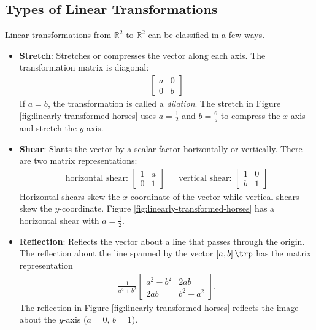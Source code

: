 \subsection*{Types of Linear Transformations} %

Linear transformations from $\mathbb{R}^2$ to $\mathbb{R}^2$ can be classified in a few ways.

\begin{itemize}

\item \textbf{Stretch}: %
Stretches or compresses the vector along each axis.
The transformation matrix is diagonal:
%
\begin{align*}
\left[\begin{array}{rr}
a & 0  \\
0 & b
\end{array}\right]
\end{align*}
%
If $a=b$, the transformation is called a \emph{dilation}.
The stretch in Figure \ref{fig:linearly-transformed-horses} uses $a = \frac{1}{2}$ and $b = \frac{6}{5}$ to compress the $x$-axis and stretch the $y$-axis.

\item \textbf{Shear}: %
Slants the vector by a scalar factor horizontally or vertically.
There are two matrix representations:
%
\begin{align*}
\text{horizontal shear:\ }
\left[\begin{array}{cc}
1 & a\\
0 & 1
\end{array}\right]
&&
\text{vertical shear:\ }
\left[\begin{array}{cc}
1 & 0\\
b & 1
\end{array}\right]
\end{align*}
%
Horizontal shears skew the $x$-coordinate of the vector while vertical shears skew the $y$-coordinate.
Figure \ref{fig:linearly-transformed-horses} has a horizontal shear with $a=\frac{1}{2}$.

\item \textbf{Reflection}: Reflects the vector about a line that passes through the origin.
The reflection about the line spanned by the vector $\left[a, b\right]\trp$ has the matrix representation
%
\begin{align*}
\frac{1}{a^2 + b^2}
\left[\begin{array}{cc}
a^2 - b^2 & 2ab \\
2ab       & b^2 - a^2
\end{array}\right].
\end{align*}
%
The reflection in Figure \ref{fig:linearly-transformed-horses} reflects the image about the $y$-axis ($a=0$, $b=1$).


\end{itemize}
